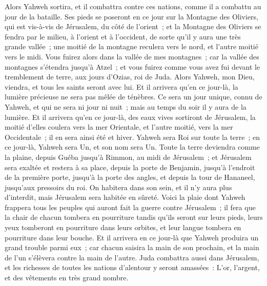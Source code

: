 \begin{multicols}{2}
Alors Yahweh sortira, et il combattra contre ces nations, comme il a combattu au jour de la bataille.
Ses pieds se poseront en ce jour sur la Montagne des Oliviers, qui est vis-à-vis de Jérusalem, du côté de l'orient~; et la Montagne des Oliviers se fendra par le milieu, à l'orient et à l'occident, de sorte qu'il y aura une très grande vallée~; une moitié de la montagne reculera vers le nord, et l'autre moitié vers le midi.
Vous fuirez alors dans la vallée de mes montagnes~; car la vallée des montagnes s'étendra jusqu'à Atzel~; et vous fuirez comme vous avez fui devant le tremblement de terre, aux jours d'Ozias, roi de Juda. Alors Yahweh, mon Dieu, viendra, et tous les saints seront avec lui.
Et il arrivera qu'en ce jour-là, la lumière précieuse ne sera pas mêlée de ténèbres.
Ce sera un jour unique, connu de Yahweh, et qui ne sera ni jour ni nuit~; mais au temps du soir il y aura de la lumière.
Et il arrivera qu'en ce jour-là, des eaux vives sortiront de Jérusalem, la moitié d'elles coulera vers la mer Orientale, et l'autre moitié, vers la mer Occidentale~; il en sera ainsi été et hiver.
Yahweh sera Roi sur toute la terre~; en ce jour-là, Yahweh sera Un, et son nom sera Un.
Toute la terre deviendra comme la plaine, depuis Guéba jusqu'à Rimmon, au midi de Jérusalem~; et Jérusalem sera exaltée et restera à sa place, depuis la porte de Benjamin, jusqu'à l'endroit de la première porte, jusqu'à la porte des angles, et depuis la tour de Hananeel, jusqu'aux pressoirs du roi.
On habitera dans son sein, et il n'y aura plus d'interdit, mais Jérusalem sera habitée en sûreté.
Voici la plaie dont Yahweh frappera tous les peuples qui auront fait la guerre contre Jérusalem~; il fera que la chair de chacun tombera en pourriture tandis qu'ils seront sur leurs pieds, leurs yeux tomberont en pourriture dans leurs orbites, et leur langue tombera en pourriture dans leur bouche.
Et il arrivera en ce jour-là que Yahweh produira un grand trouble parmi eux~; car chacun saisira la main de son prochain, et la main de l'un s'élèvera contre la main de l'autre.
Juda combattra aussi dans Jérusalem, et les richesses de toutes les nations d'alentour y seront amassées~: L'or, l'argent, et des vêtements en très grand nombre.

\end{multicols}
